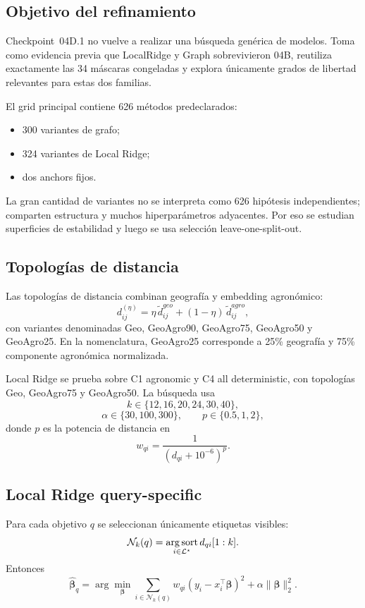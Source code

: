 \subsection{Objetivo del refinamiento}

Checkpoint~04D.1 no vuelve a realizar una búsqueda genérica de modelos. Toma como evidencia
previa que LocalRidge y Graph sobrevivieron 04B, reutiliza exactamente las 34 máscaras
congeladas y explora únicamente grados de libertad relevantes para estas dos familias.

El grid principal contiene 626 métodos predeclarados:
\begin{itemize}
\item 300 variantes de grafo;
\item 324 variantes de Local Ridge;
\item dos anchors fijos.
\end{itemize}
La gran cantidad de variantes no se interpreta como 626 hipótesis independientes; comparten
estructura y muchos hiperparámetros adyacentes. Por eso se estudian superficies de estabilidad
y luego se usa selección leave-one-split-out.

\subsection{Topologías de distancia}

Las topologías de distancia combinan geografía y embedding agronómico:
\[
d^{(\eta)}_{ij}
=
\eta\,\widetilde d^{geo}_{ij}
+
(1-\eta)\,\widetilde d^{agro}_{ij},
\]
con variantes denominadas Geo, GeoAgro90, GeoAgro75, GeoAgro50 y GeoAgro25. En la
nomenclatura, GeoAgro25 corresponde a 25\% geografía y 75\% componente agronómica
normalizada.

Local Ridge se prueba sobre C1 agronomic y C4 all deterministic, con topologías Geo,
GeoAgro75 y GeoAgro50. La búsqueda usa
\[
k\in\{12,16,20,24,30,40\},
\]
\[
\alpha\in\{30,100,300\},
\qquad
p\in\{0.5,1,2\},
\]
donde $p$ es la potencia de distancia en
\[
w_{qi}=\frac{1}{(d_{qi}+10^{-6})^p}.
\]

\subsection{Local Ridge query-specific}

Para cada objetivo $q$ se seleccionan únicamente etiquetas visibles:
\[
\mathcal N_k(q)
=
\operatorname*{arg\,sort}_{i\in\mathcal{L}^\star}
d_{qi}[1:k].
\]
Entonces
\begin{equation}
\hat{\bm\beta}_q
=
\arg\min_{\bm\beta}
\sum_{i\in\mathcal N_k(q)}
w_{qi}
(y_i-x_i^\top\bm\beta)^2
+
\alpha\|\bm\beta\|_2^2.
\label{eq:cp04d-localridge}
\end{equation}

